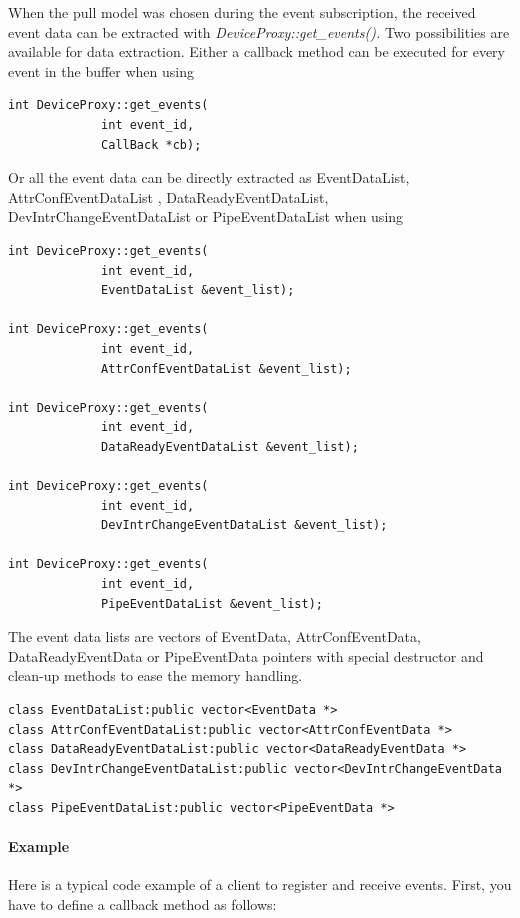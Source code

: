 When the pull model was chosen during the event subscription, the
received event data can be extracted with \emph{DeviceProxy::get\_events().}
Two possibilities are available for data extraction. Either a callback
method can be executed for every event in the buffer when using
\begin{verbatim}
int DeviceProxy::get_events( 
             int event_id, 
             CallBack *cb);
\end{verbatim}
Or all the event data can be directly extracted as EventDataList,
AttrConfEventDataList , DataReadyEventDataList,
DevIntrChangeEventDataList or PipeEventDataList
when using
\begin{verbatim}
int DeviceProxy::get_events( 
             int event_id, 
             EventDataList &event_list);

int DeviceProxy::get_events( 
             int event_id, 
             AttrConfEventDataList &event_list);

int DeviceProxy::get_events( 
             int event_id, 
             DataReadyEventDataList &event_list);

int DeviceProxy::get_events( 
             int event_id, 
             DevIntrChangeEventDataList &event_list);

int DeviceProxy::get_events( 
             int event_id, 
             PipeEventDataList &event_list);
\end{verbatim}
The event data lists are vectors of EventData, AttrConfEventData,
DataReadyEventData or PipeEventData pointers with special destructor
and clean-up methods to ease the memory handling.
\begin{verbatim}
class EventDataList:public vector<EventData *>
class AttrConfEventDataList:public vector<AttrConfEventData *>
class DataReadyEventDataList:public vector<DataReadyEventData *>
class DevIntrChangeEventDataList:public vector<DevIntrChangeEventData *>
class PipeEventDataList:public vector<PipeEventData *>
\end{verbatim}

\paragraph{Example}

Here is a typical code example of a client to register and receive
events. First, you have to define a callback method
as follows:


